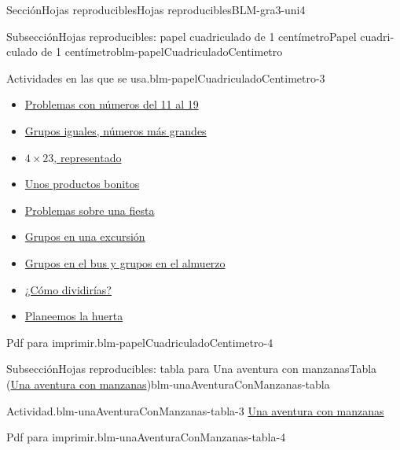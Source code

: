 \documentclass[oneside,10pt,]{article}
\begin{document}
\begin{sectionptx}{Sección}{Hojas reproducibles}{}{Hojas reproducibles}{}{}{BLM-gra3-uni4}
\begin{spanish}
\begin{subsectionptx}{Subsección}{Hojas reproducibles: papel cuadriculado de 1 centímetro}{}{Papel cuadriculado de 1 centímetro}{}{}{blm-papelCuadriculadoCentimetro}
\begin{paragraphs}{Actividades en las que se usa.}{blm-papelCuadriculadoCentimetro-3}
\begin{itemize}[label=\textbullet]
\item{}\hyperref[act-problemasNumerosAdolescentes]{Problemas con números del 11 al 19}%
\item{}\hyperref[act-problemasMultNums11a19MasGrandes]{Grupos iguales, números más grandes}%
\item{}\hyperref[act-representar4por23]{\(4\times 23\), representado}%
\item{}\hyperref[act-prodsUnDigitoPorMayorA20]{Unos productos bonitos}%
\item{}\hyperref[act-problemasMultiplicativosFiesta]{Problemas sobre una fiesta}%
\item{}\hyperref[act-gruposEnExcursion]{Grupos en una excursión}%
\item{}\hyperref[act-gruposEnBusYAlmuerzo]{Grupos en el bus y grupos en el almuerzo}%
\item{}\hyperref[act-ComoDividirias]{¿Cómo dividirías?}%
\item{}\hyperref[act-planeemosLaHuerta]{Planeemos la huerta}%
\end{itemize}
\end{paragraphs}%
\begin{paragraphs}{Pdf para imprimir.}{blm-papelCuadriculadoCentimetro-4}%
%
\end{paragraphs}%
\end{subsectionptx}
\end{spanish}
%
%
\typeout{************************************************}
\typeout{************************************************}
%
\begin{spanish}
\begin{subsectionptx}{Subsección}{Hojas reproducibles: tabla para Una aventura con manzanas}{}{Tabla (\hyperref[act-unaAventuraConManzanas]{Una aventura con manzanas})}{}{}{blm-unaAventuraConManzanas-tabla}
\begin{paragraphs}{Actividad.}{blm-unaAventuraConManzanas-tabla-3}%
\hyperref[act-unaAventuraConManzanas]{Una aventura con manzanas}%
\end{paragraphs}%
\begin{paragraphs}{Pdf para imprimir.}{blm-unaAventuraConManzanas-tabla-4}%
%
\end{paragraphs}%
\end{subsectionptx}
\end{spanish}
%
%
\typeout{************************************************}

\end{sectionptx}
\end{document}

